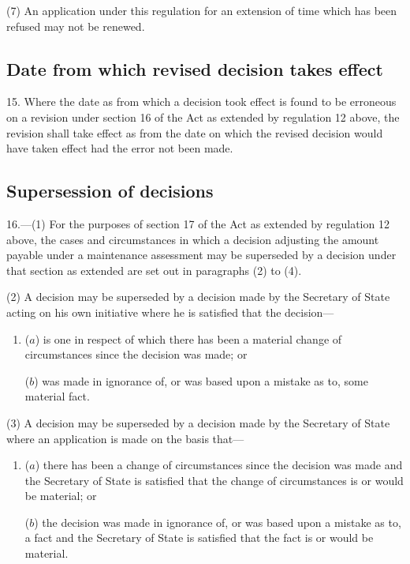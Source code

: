 \documentclass[12pt,a4paper]{article}
\begin{document}
(7) An application under this regulation for an extension of time which has been refused may not be renewed.


\subsection[15. Date from which revised decision takes effect]{Date from which revised decision takes effect}

15.  Where the date as from which a decision took effect is found to be erroneous on a revision under section 16 of the Act as extended by regulation 12 above, the revision shall take effect as from the date on which the revised decision would have taken effect had the error not been made.


\subsection[16. Supersession of decisions]{Supersession of decisions}

16.—(1) For the purposes of section 17 of the Act as extended by regulation 12 above, the cases and circumstances in which a decision adjusting the amount payable under a maintenance assessment may be superseded by a decision under that section as extended are set out in paragraphs (2) to (4).

(2) A decision may be superseded by a decision made by the Secretary of State acting on his own initiative where he is satisfied that the decision—
\begin{enumerate}\item[]
($a$) is one in respect of which there has been a material change of circumstances since the decision was made; or

($b$) was made in ignorance of, or was based upon a mistake as to, some material fact.
\end{enumerate}

(3) A decision may be superseded by a decision made by the Secretary of State where an application is made on the basis that—
\begin{enumerate}\item[]
($a$) there has been a change of circumstances since the decision was made and the Secretary of State is satisfied that the change of circumstances is or would be material; or

($b$) the decision was made in ignorance of, or was based upon a mistake as to, a fact and the Secretary of State is satisfied that the fact is or would be material.
\end{enumerate}
\end{document}
